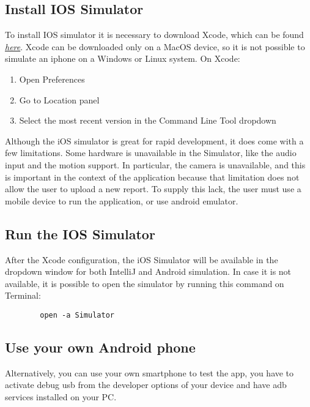 \documentclass[../ITD.tex]{subfiles}
\begin{document}
    \subsection{Install IOS Simulator}\label{subsec:install-ios-emulator-on-android-studio}
    To install IOS simulator it is necessary to download Xcode, which can be found
    \href{https://apps.apple.com/it/app/xcode/id497799835?mt=12}{\textit{here}}.
    Xcode can be downloaded only on a MacOS device, so it is not possible to simulate an iphone on a Windows or Linux system.
    On Xcode:
    \begin{enumerate}
        \item Open Preferences
        \item Go to Location panel
        \item Select the most recent version in the Command Line Tool dropdown
    \end{enumerate}
    Although the iOS simulator is great for rapid development, it does come with a few limitations.
    Some hardware is unavailable in the Simulator, like the audio input and the motion support.
    In particular, the camera is unavailable, and this is important in the context of the application because that limitation does not allow the user to upload a new report.
    To supply this lack, the user must use a mobile device to run the application, or use android emulator.

    \subsection{Run the IOS Simulator}\label{subsec:run-the-ios-simulator}
    After the Xcode configuration, the iOS Simulator will be available in the dropdown window for both IntelliJ and Android simulation.
    In case it is not available, it is possible to open the simulator by running this command on Terminal:
    \begin{verbatim}
        open -a Simulator
    \end{verbatim}

    \subsection{Use your own Android phone}\label{subsec:use-your-own-android-phone}
    Alternatively, you can use your own smartphone to test the app, you have to activate debug usb from
    the developer options of your device and have adb services installed on your PC.
\end{document}
